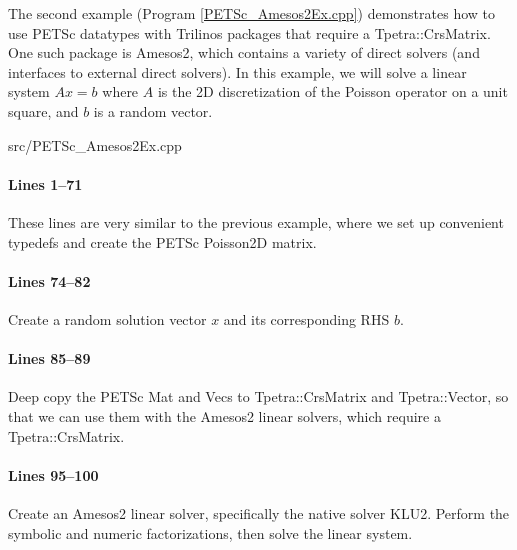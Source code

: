 The second example (Program \ref{PETSc_Amesos2Ex.cpp}) demonstrates how to use
PETSc datatypes with Trilinos packages that require a Tpetra::CrsMatrix.  One
such package is Amesos2, which contains a variety of direct solvers (and
interfaces to external direct solvers).  In this example, we will solve a linear
system $Ax=b$ where $A$ is the 2D discretization of the Poisson operator on a
unit square, and $b$ is a random vector.

\begin{lstinputlisting}[caption=PETSc\_Amesos2Ex.cpp,label=PETSc_Amesos2Ex.cpp]{src/PETSc_Amesos2Ex.cpp}
\end{lstinputlisting}

\paragraph{Lines 1--71}
These lines are very similar to the previous example, where we set up convenient
typedefs and create the PETSc Poisson2D matrix.

\paragraph{Lines 74--82}
Create a random solution vector $x$ and its corresponding RHS $b$.

\paragraph{Lines 85--89}
Deep copy the PETSc Mat and Vecs to Tpetra::CrsMatrix and Tpetra::Vector, so
that we can use them with the Amesos2 linear solvers, which require a
Tpetra::CrsMatrix.

\paragraph{Lines 95--100}
Create an Amesos2 linear solver, specifically the native solver KLU2.  Perform
the symbolic and numeric factorizations, then solve the linear system.
